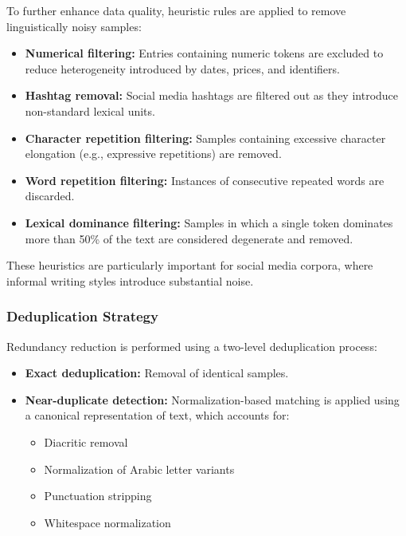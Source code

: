 \documentclass[12pt,a4paper]{report}
\begin{document}
To further enhance data quality, heuristic rules are applied to remove linguistically noisy samples:

\begin{itemize}
    \item \textbf{Numerical filtering:} Entries containing numeric tokens are excluded to reduce heterogeneity introduced by dates, prices, and identifiers.
    \item \textbf{Hashtag removal:} Social media hashtags are filtered out as they introduce non-standard lexical units.
    \item \textbf{Character repetition filtering:} Samples containing excessive character elongation (e.g., expressive repetitions) are removed.
    \item \textbf{Word repetition filtering:} Instances of consecutive repeated words are discarded.
    \item \textbf{Lexical dominance filtering:} Samples in which a single token dominates more than 50\% of the text are considered degenerate and removed.
\end{itemize}

These heuristics are particularly important for social media corpora, where informal writing styles introduce substantial noise.


\subsubsection{Deduplication Strategy}

Redundancy reduction is performed using a two-level deduplication process:

\begin{itemize}
    \item \textbf{Exact deduplication:} Removal of identical samples.
    \item \textbf{Near-duplicate detection:} Normalization-based matching is applied using a canonical representation of text, which accounts for:
    \begin{itemize}
        \item Diacritic removal
        \item Normalization of Arabic letter variants
        \item Punctuation stripping
        \item Whitespace normalization
    \end{itemize}
\end{itemize}
\end{document}
